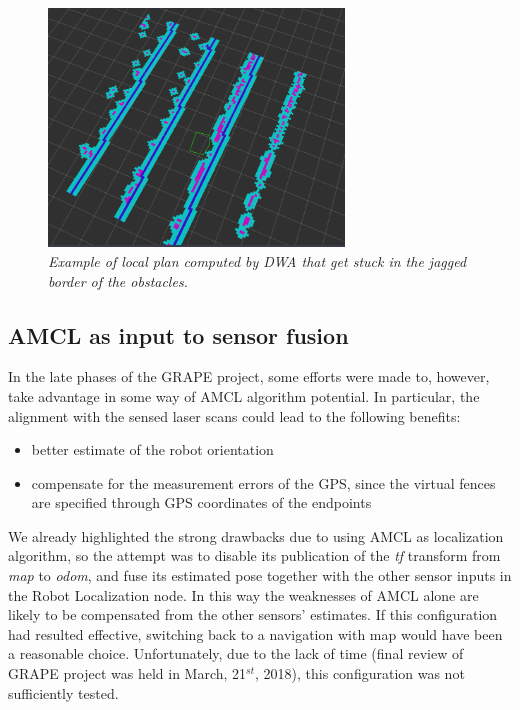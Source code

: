\begin{figure}
	\centering
	\includegraphics[width=0.7\textwidth]{Images/localization/localCostmap_stuck.png}
	\caption{\textit{Example of local plan computed by DWA that get stuck in the jagged border of the obstacles.}}
	\label{fig:dwaStuck}
\end{figure}

\subsection{AMCL as input to sensor fusion}
In the late phases of the \ac{GRAPE} project, some efforts were made to, however, take advantage in some way of \ac{AMCL} algorithm potential. In particular, the alignment with the sensed laser scans could lead to the following benefits:
\begin{itemize}
	\item better estimate of the robot orientation 
	\item compensate for the measurement errors of the GPS, since the virtual fences are specified through GPS coordinates of the endpoints
\end{itemize}

We already highlighted the strong drawbacks due to using \ac{AMCL} as localization algorithm, so the attempt was to disable its publication of the \textit{tf} transform from \textit{map} to \textit{odom}, and fuse its estimated pose together with the other sensor inputs in the Robot Localization node. In this way the weaknesses of \ac{AMCL} alone are likely to be compensated from the other sensors' estimates. If this configuration had resulted effective, switching back to a navigation with map would have been a reasonable choice. Unfortunately, due to the lack of time (final review of \ac{GRAPE} project was held in March, 21$^{st}$, 2018), this configuration was not sufficiently tested. 

